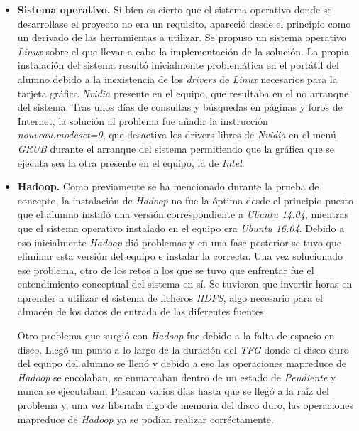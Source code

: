 \begin{itemize}
\item \textbf{Sistema operativo.} Si bien es cierto que el sistema operativo donde se desarrollase el proyecto no era un requisito, apareció desde el principio como un derivado de las herramientas a utilizar. Se propuso un sistema operativo \textit{Linux} \cite{wikilinux} sobre el que llevar a cabo la implementación de la solución. 
La propia instalación del sistema resultó inicialmente problemática en el portátil del alumno debido a la inexistencia de los \textit{drivers} de \textit{Linux} necesarios para la tarjeta gráfica \textit{Nvidia} \cite{wikinvidia} presente en el equipo, que resultaba en el no arranque del sistema. Tras unos días de consultas y búsquedas en páginas y foros de Internet, la solución al problema fue añadir la instrucción \textit{nouveau.modeset=0}, que desactiva los drivers libres de \textit{Nvidia} en el menú \textit{GRUB} \cite{grub} durante el arranque del sistema permitiendo que la gráfica que se ejecuta sea la otra presente en el equipo, la de \textit{Intel}.
\item \textbf{Hadoop.} Como previamente se ha mencionado durante la prueba de concepto, la instalación de \textit{Hadoop} no fue la óptima desde el principio puesto que el alumno instaló una versión correspondiente a \textit{Ubuntu 14.04}, mientras que el sistema operativo instalado en el equipo era \textit{Ubuntu 16.04}. Debido a eso inicialmente \textit{Hadoop} dió problemas y en una fase posterior se tuvo que eliminar esta versión del equipo e instalar la correcta. Una vez solucionado ese problema, otro de los retos a los que se tuvo que enfrentar fue el entendimiento conceptual del sistema en sí. Se tuvieron que invertir horas en aprender a utilizar el sistema de ficheros \textit{HDFS}, algo necesario para el almacén de los datos de entrada de las diferentes fuentes. 
\par
Otro problema que surgió con \textit{Hadoop} fue debido a la falta de espacio en disco. Llegó un punto a lo largo de la duración del \textit{TFG} donde el disco duro del equipo del alumno se llenó y debido a eso las operaciones \gls{mapreduce} de \textit{Hadoop} se encolaban, se enmarcaban dentro de un estado de \textit{Pendiente} y nunca se ejecutaban. Pasaron varios días hasta que se llegó a la raíz del problema y, una vez liberada algo de memoria del disco duro, las operaciones \gls{mapreduce} de \textit{Hadoop} ya se podían realizar corréctamente. 

\end{itemize}
